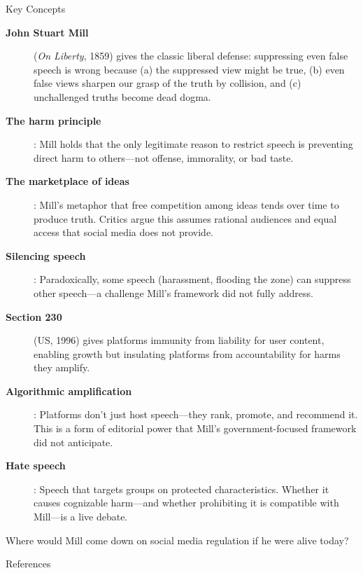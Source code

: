 ﻿\documentclass[aspectratio=169,11pt]{beamer}
\begin{document}
\begin{frame}[allowframebreaks]{Key Concepts}
\footnotesize
\begin{description}
    \item[\textbf{John Stuart Mill}] (\textit{On Liberty}, 1859) gives the classic liberal defense: suppressing even false speech is wrong because (a) the suppressed view might be true, (b) even false views sharpen our grasp of the truth by collision, and (c) unchallenged truths become dead dogma.
    \item[\textbf{The harm principle}]: Mill holds that the only legitimate reason to restrict speech is preventing direct harm to others---not offense, immorality, or bad taste.
    \item[\textbf{The marketplace of ideas}]: Mill's metaphor that free competition among ideas tends over time to produce truth. Critics argue this assumes rational audiences and equal access that social media does not provide.
    \item[\textbf{Silencing speech}]: Paradoxically, some speech (harassment, flooding the zone) can suppress other speech---a challenge Mill's framework did not fully address.
    \item[\textbf{Section 230}] (US, 1996) gives platforms immunity from liability for user content, enabling growth but insulating platforms from accountability for harms they amplify.
    \item[\textbf{Algorithmic amplification}]: Platforms don't just host speech---they rank, promote, and recommend it. This is a form of editorial power that Mill's government-focused framework did not anticipate.
    \item[\textbf{Hate speech}]: Speech that targets groups on protected characteristics. Whether it causes cognizable harm---and whether prohibiting it is compatible with Mill---is a live debate.
\end{description}

\begin{discussionbox}[Discussion]
Where would Mill come down on social media regulation if he were alive today?
\end{discussionbox}
\end{frame}

\begin{frame}[allowframebreaks]{References}
\printbibliography[heading=none]
\end{frame}
\end{document}
